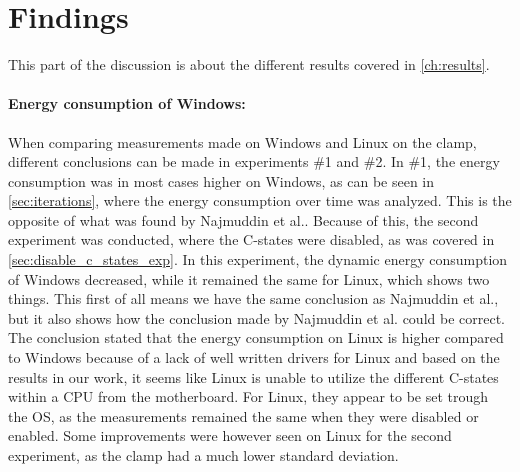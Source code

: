 \section{Findings}

This part of the discussion is about the different results covered in \cref{ch:results}.

\paragraph*{Energy consumption of Windows:} When comparing measurements made on Windows and Linux on the clamp, different conclusions can be made in experiments \#1 and \#2. In \#1, the energy consumption was in most cases higher on Windows, as can be seen in \cref{sec:iterations}, where the energy consumption over time was analyzed. This is the opposite of what was found by Najmuddin et al.\cite[]{Najmuddin2021}. Because of this, the second experiment was conducted, where the C-states were disabled, as was covered in \cref{sec:disable_c_states_exp}. In this experiment, the dynamic energy consumption of Windows decreased, while it remained the same for Linux, which shows two things. This first of all means we have the same conclusion as Najmuddin et al.\cite[]{Najmuddin2021}, but it also shows how the conclusion made by Najmuddin et al.\cite[]{Najmuddin2021} could be correct. The conclusion stated that the energy consumption on Linux is higher compared to Windows because of a lack of well written drivers for Linux and based on the results in our work, it seems like Linux is unable to utilize the different C-states within a CPU from the motherboard. For Linux, they appear to be set trough the OS, as the measurements remained the same when they were disabled or enabled. Some improvements were however seen on Linux for the second experiment, as the clamp had a much lower standard deviation.

